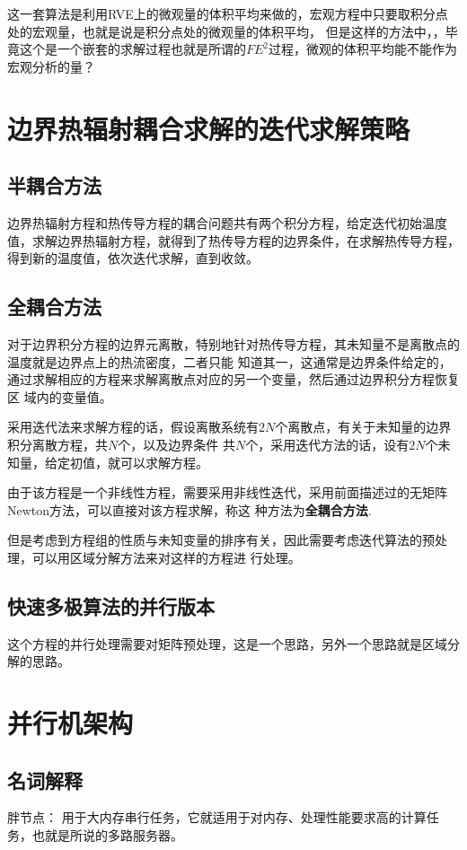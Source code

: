 \begin{think}
	这一套算法是利用RVE上的微观量的体积平均来做的，宏观方程中只要取积分点处的宏观量，也就是说是积分点处的微观量的体积平均，
	但是这样的方法中，\color{red}{宏观网格与RVE的选取有没关联}，毕竟这个是一个嵌套的求解过程也就是所谓的$FE^2$过程，微观的体积平均能不能作为宏观分析的量？
\end{think}

\section{边界热辐射耦合求解的迭代求解策略}
\subsection{半耦合方法}
边界热辐射方程和热传导方程的耦合问题共有两个积分方程，给定迭代初始温度值，求解边界热辐射方程，就得到了热传导方程的边界条件，在求解热传导方程，得到新的温度值，依次迭代求解，直到收敛。
\subsection{全耦合方法}

对于边界积分方程的边界元离散，特别地针对热传导方程，其未知量不是离散点的温度就是边界点上的热流密度，二者只能
知道其一，这通常是边界条件给定的，通过求解相应的方程来求解离散点对应的另一个变量，然后通过边界积分方程恢复区
域内的变量值。


采用迭代法来求解方程的话，假设离散系统有$2N$个离散点，有关于未知量的边界积分离散方程，共$N$个，以及边界条件
共$N$个，采用迭代方法的话，设有$2N$个未知量，给定初值，就可以求解方程。

由于该方程是一个非线性方程，需要采用非线性迭代，采用前面描述过的无矩阵Newton方法，可以直接对该方程求解，称这
种方法为\textbf{全耦合方法}.

但是考虑到方程组的性质与未知变量的排序有关，因此需要考虑迭代算法的预处理，可以用区域分解方法来对这样的方程进
行处理。

\subsection{快速多极算法的并行版本}
这个方程的并行处理需要对矩阵预处理，这是一个思路，另外一个思路就是区域分解的思路。

\section{并行机架构}
\subsection{名词解释}
{胖节点}： 用于大内存串行任务，它就适用于对内存、处理性能要求高的计算任务，也就是所说的多路服务器。


